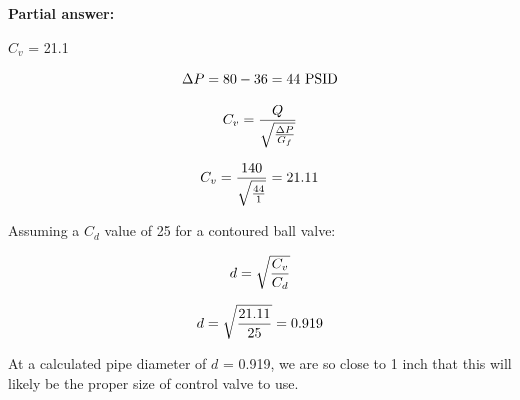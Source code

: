 





\noindent
{\bf Partial answer:}

\vskip 10pt

$C_v$ = 21.1







$$\Delta P = 80 - 36 = 44 \hbox{ PSID}$$

$$C_v = {Q \over \sqrt{\Delta P \over G_f}}$$

$$C_v = {140 \over \sqrt{44 \over 1}} = 21.11$$

\vskip 10pt

Assuming a $C_d$ value of 25 for a contoured ball valve:

$$d = \sqrt{C_v \over C_d}$$

$$d = \sqrt{21.11 \over 25} = 0.919$$

At a calculated pipe diameter of $d$ = 0.919, we are so close to 1 inch that this will likely be the proper size of control valve to use.




